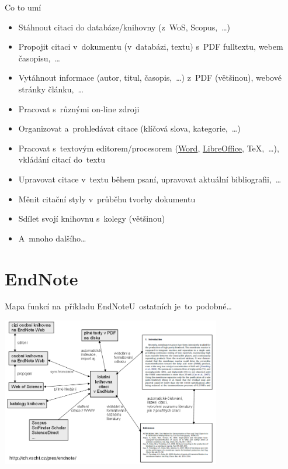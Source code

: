 \documentclass[compress, xelatex, 11pt, xcolor=svgnames, aspectratio=169,
	hyperref={
		bookmarks=true,
		unicode=true,
		colorlinks=true,
		pdftitle={Citacni software},
		plainpages=false,
		pdfauthor={Vojtech Zeisek},
		pdfsubject={Kratky uvod do citacniho software},
		pdfcreator={XeLaTeX},
		pdfkeywords={citace, reference, software, literatura},
		linkcolor=Crimson, %
		anchorcolor=Magenta, %
		citecolor=Magenta, %
		filecolor=Magenta, %
		menucolor=Magenta, %
		urlcolor=DarkTurquoise, %
		},
	url={hyphens, lowtilde} %
	]{beamer}
\begin{document}
\begin{frame}{Co to umí}
	\begin{itemize}
		\item Stáhnout citaci do databáze/knihovny (z~WoS, Scopus,~\ldots)
		\item Propojit citaci v~dokumentu (v~databázi, textu) s~PDF fulltextu, webem časopisu,~\ldots
		\item Vytáhnout informace (autor, titul, časopis,~\ldots) z~PDF (většinou), webové stránky článku,~\ldots
		\item Pracovat s~různými on-line zdroji
		\item Organizovat a~prohledávat citace (klíčová slova, kategorie,~\ldots)
		\item Pracovat s~textovým editorem/procesorem (\href{https://www.natur.cuni.cz/fakulta/cit/podpora-uzivatelu/softwarove-licence}{Word}, \href{https://cs.libreoffice.org/}{LibreOffice}, \TeX,~\ldots), vkládání citací do~textu
		\item Upravovat citace v~textu během psaní, upravovat aktuální bibliografii,~\ldots
		\item Měnit citační styly v~průběhu tvorby dokumentu
		\item Sdílet svojí knihovnu s~kolegy (většinou)
		\item A~mnoho dalšího\ldots
	\end{itemize}
\end{frame}

\section{EndNote}

\begin{frame}{Mapa funkcí na~příkladu EndNote}{U~ostatních je~to~podobné\ldots}
	\begin{center}
		\includegraphics[height=6.5cm]{mapa_funkci.png}
	\end{center}
\end{frame}
\end{document}

